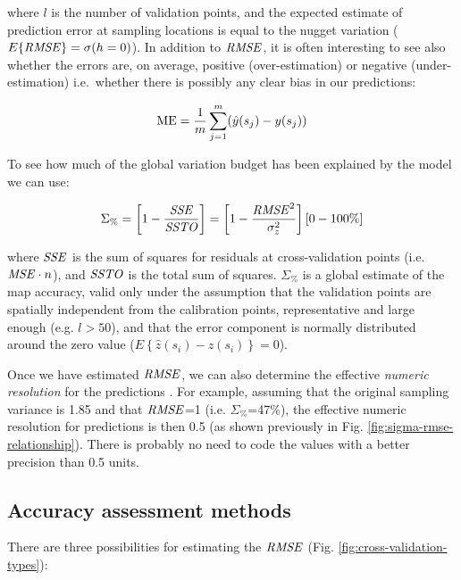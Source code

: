 \documentclass[graybox,natbib,nospthms,UStrade]{svmono}
\begin{document}
where \(l\) is the number of validation points, and the expected estimate
of prediction error at sampling locations is equal to the nugget
variation (\(E\{ {\it RMSE} \} = \sigma({{h}}=0)\)). In addition to \(\it{RMSE}\),
it is often interesting to see also whether the errors are, on average, positive
(over-estimation) or negative (under-estimation) i.e.~whether there is possibly
any clear bias in our predictions:

\begin{equation}
{\rm ME} = \frac{1}{m} \sum_{j=1}^{m} (\hat y ({ s}_j) - y ({ s}_j))
\label{eq:ME}
\end{equation}

To see how much of the global variation budget has been explained by the model we can use:

\begin{equation}
 {\Sigma}_{\%} = \left[ 1 - \frac{{\it{SSE}}}{{\it{SSTO}}} \right] = \left[ 1 - \frac{{\it{RMSE}}^2}{\sigma_z^2} \right] [0-100\%]
\label{eq:normvar}
\end{equation}

where \(\it{SSE}\) is the sum of squares for residuals at cross-validation
points (i.e. \({\it{MSE}} \cdot n\)), and \(\it{SSTO}\) is the total sum of
squares. \({\Sigma}_{\%}\) is a global estimate of the map accuracy, valid
only under the assumption that the validation points are spatially
independent from the calibration points, representative and large enough
(e.g. \(l>50\)), and that the error component is normally distributed
around the zero value
(\(E\left\{ {\hat z({{{s}}_i}) - z({{{s}}_i})} \right\} = 0\)).

Once we have estimated \(\it{RMSE}\), we can also determine the effective
\emph{numeric resolution} for the predictions \citep{Hengl2013JAG}. For example,
assuming that the original sampling variance is 1.85 and that
\(\it{RMSE}\)=1 (i.e. \({\Sigma}_{\%}\)=47\%), the effective numeric
resolution for predictions is then 0.5 (as shown previously in
Fig. \ref{fig:sigma-rmse-relationship}). There is
probably no need to code the values with a better precision than 0.5
units.

\hypertarget{accuracy-assessment-methods}{%
\subsection{Accuracy assessment methods}\label{accuracy-assessment-methods}}

There are three possibilities for estimating the \(\it{RMSE}\)
(Fig. \ref{fig:cross-validation-types}):
\end{document}
